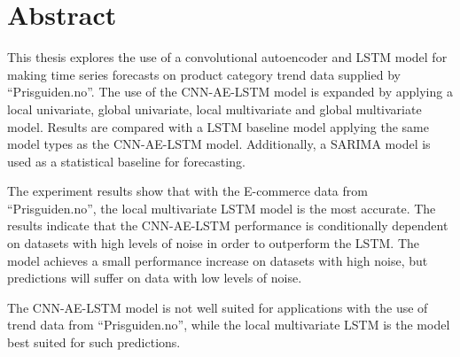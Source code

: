 \section*{Abstract}
\label{section:Abstract}





This thesis explores the use of a convolutional autoencoder and LSTM model for making time series
forecasts on product category trend data supplied by ``Prisguiden.no''.
The use of the CNN-AE-LSTM model is expanded by applying a local univariate, global univariate, local multivariate and global multivariate model.
Results are compared with a LSTM baseline model applying the same model types as the CNN-AE-LSTM model.
Additionally, a SARIMA model is used as a statistical baseline for forecasting.


The experiment results show that with the E-commerce data from ``Prisguiden.no'',
the local multivariate LSTM model is the most accurate.
The results indicate that the CNN-AE-LSTM performance is conditionally dependent on datasets with high levels of noise in order to outperform the LSTM.
The model achieves a small performance increase on datasets with high noise, but predictions will suffer
on data with low levels of noise.

The CNN-AE-LSTM model is not well suited for applications with the use of trend data from ``Prisguiden.no'',
while the local multivariate LSTM is the model best suited for such predictions.







